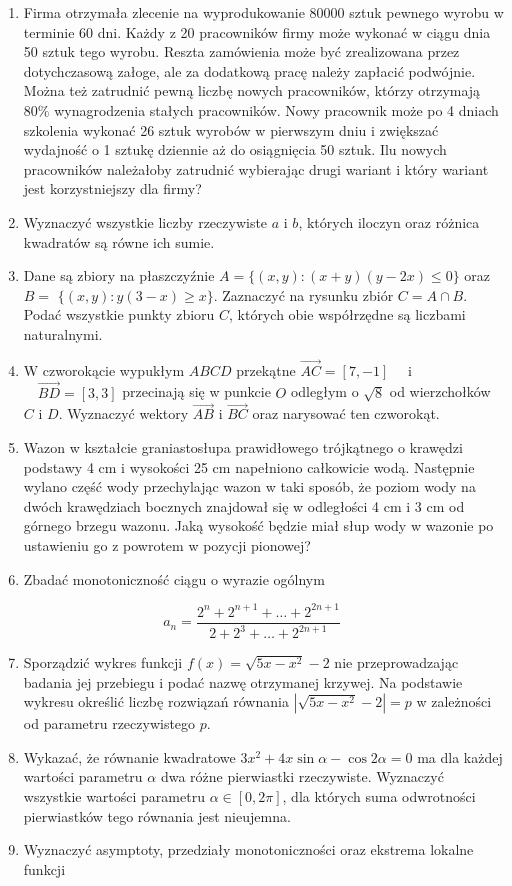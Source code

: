 \documentclass[10pt]{article}
\begin{document}
\begin{enumerate}
  \item Firma otrzymała zlecenie na wyprodukowanie 80000 sztuk pewnego wyrobu w terminie 60 dni. Każdy z 20 pracowników firmy może wykonać w ciągu dnia 50 sztuk tego wyrobu. Reszta zamówienia może być zrealizowana przez dotychczasową załoge, ale za dodatkową pracę należy zapłacić podwójnie. Można też zatrudnić pewną liczbę nowych pracowników, którzy otrzymają $80 \%$ wynagrodzenia stałych pracowników. Nowy pracownik może po 4 dniach szkolenia wykonać 26 sztuk wyrobów w pierwszym dniu i zwiększać wydajność o 1 sztukę dziennie aż do osiągnięcia 50 sztuk. Ilu nowych pracowników należałoby zatrudnić wybierając drugi wariant i który wariant jest korzystniejszy dla firmy?
  \item Wyznaczyć wszystkie liczby rzeczywiste $a$ i $b$, których iloczyn oraz różnica kwadratów są równe ich sumie.
  \item Dane są zbiory na płaszczyźnie $A=\{(x, y):(x+y)(y-2 x) \leqslant 0\}$ oraz $B=$ $\{(x, y): y(3-x) \geqslant x\}$. Zaznaczyć na rysunku zbiór $C=A \cap B$. Podać wszystkie punkty zbioru $C$, których obie współrzędne są liczbami naturalnymi.
  \item W czworokącie wypukłym $A B C D$ przekątne $\overrightarrow{A C}=[7,-1] \quad$ i $\quad \overrightarrow{B D}=[3,3]$ przecinają się w punkcie $O$ odległym o $\sqrt{8}$ od wierzchołków $C$ i $D$. Wyznaczyć wektory $\overrightarrow{A B}$ i $\overrightarrow{B C}$ oraz narysować ten czworokąt.
  \item Wazon w kształcie graniastosłupa prawidłowego trójkątnego o krawędzi podstawy 4 cm i wysokości 25 cm napełniono całkowicie wodą. Następnie wylano część wody przechylając wazon w taki sposób, że poziom wody na dwóch krawędziach bocznych znajdował się w odległości 4 cm i 3 cm od górnego brzegu wazonu. Jaką wysokość będzie miał słup wody w wazonie po ustawieniu go z powrotem w pozycji pionowej?
  \item Zbadać monotoniczność ciągu o wyrazie ogólnym
\end{enumerate}

$$
a_{n}=\frac{2^{n}+2^{n+1}+\ldots+2^{2 n+1}}{2+2^{3}+\ldots+2^{2 n+1}}
$$

\begin{enumerate}
  \setcounter{enumi}{6}
  \item Sporządzić wykres funkcji $f(x)=\sqrt{5 x-x^{2}}-2$ nie przeprowadzając badania jej przebiegu i podać nazwę otrzymanej krzywej. Na podstawie wykresu określić liczbę rozwiązań równania $\left|\sqrt{5 x-x^{2}}-2\right|=p$ w zależności od parametru rzeczywistego $p$.
  \item Wykazać, że równanie kwadratowe $3 x^{2}+4 x \sin \alpha-\cos 2 \alpha=0$ ma dla każdej wartości parametru $\alpha$ dwa różne pierwiastki rzeczywiste. Wyznaczyć wszystkie wartości parametru $\alpha \in[0,2 \pi]$, dla których suma odwrotności pierwiastków tego równania jest nieujemna.
  \item Wyznaczyć asymptoty, przedziały monotoniczności oraz ekstrema lokalne funkcji
\end{enumerate}
\end{document}
